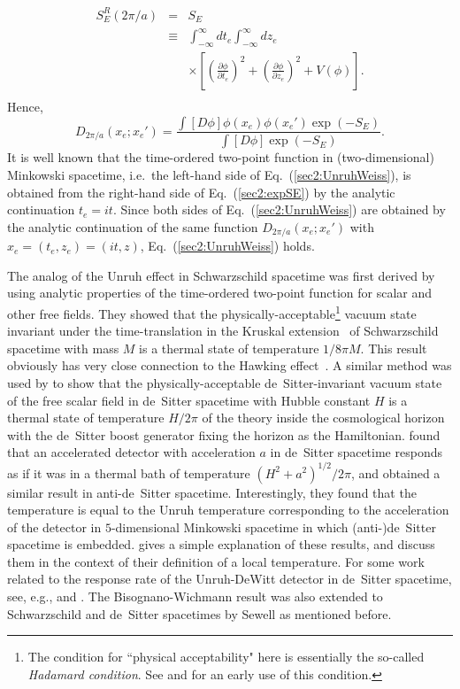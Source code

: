 \documentclass[12pt,nofootinbib,floatfix,aps,prd,showpacs,amsmath,amssymb,eqsecnum]{revtex4-2}
\let\cite\citep
\begin{document}
\begin{eqnarray}
S_E^R(2\pi/a) & = & S_E\nonumber \\
& \equiv & \int_{-\infty}^\infty dt_e \int_{-\infty}^\infty
dz_e\nonumber \\
&& \times \left[ \left(\frac{\partial\phi}{\partial t_e}\right)^2
+ \left(\frac{\partial\phi}{\partial z_e}\right)^2 + V(\phi)\right].
\nonumber \\
\end{eqnarray}
Hence,
\begin{equation}
D_{2\pi/a}(x_e;x_e')
= \frac{\int \left[D\phi\right]\phi(x_e)\phi(x_e')\exp(-S_E)}{
\int\left[D\phi\right] \exp(-S_E)}. \label{sec2:expSE}
\end{equation}
It is well known that the time-ordered two-point function in
(two-dimensional) Minkowski spacetime, i.e.~the left-hand side of
Eq.~(\ref{sec2:UnruhWeiss}), is obtained from the right-hand
side of Eq.~(\ref{sec2:expSE}) 
by the analytic continuation $t_e = it$.  Since both sides of
Eq.~(\ref{sec2:UnruhWeiss}) are obtained by the analytic continuation of
the same function $D_{2\pi/a}(x_e;x_e')$ 
with $x_e = (t_e,z_e) = (it,z)$, Eq.~(\ref{sec2:UnruhWeiss}) holds.

The analog of the Unruh effect in Schwarzschild spacetime
was first derived by
\textcite{Hartleetal76} using analytic properties of the time-ordered 
two-point function for scalar and other free fields.
They showed that the
physically-acceptable\footnote{The condition for ``physical
acceptability" here is essentially 
the so-called {\em Hadamard condition}.  See
\textcite{Wald78} and \textcite{Fullingetal78} 
for an early use of this condition.}
vacuum state invariant under the time-translation in the Kruskal
extension~\cite{Kruskal60} of Schwarzschild spacetime with mass $M$ is
a thermal state of temperature $1/8\pi M$.  
This result obviously has very close connection
to the Hawking effect~\cite{Hawking74}. 
A similar method was used by \textcite{Gibbonsetal77} to show that the
physically-acceptable de~Sitter-invariant vacuum state
of the free scalar field in de~Sitter
spacetime with Hubble constant $H$ is a thermal state of temperature
$H/2\pi$ of the theory inside the cosmological horizon with the
de~Sitter boost generator fixing the horizon as the Hamiltonian.  
\textcite{Narnhoferetal96} found that an accelerated detector with
acceleration $a$ in de~Sitter spacetime responds as if it was in a
thermal bath of temperature $(H^2 + a^2)^{1/2}/2\pi$, and
\textcite{Deseretal97} obtained a similar result in anti-de~Sitter
spacetime.  Interestingly, they found that the temperature is equal to 
the Unruh
temperature corresponding to the 
acceleration of the detector in $5$-dimensional
Minkowski spacetime in which (anti-)de~Sitter spacetime is embedded.
\textcite{Jacobson98} gives a simple explanation of these results, and
\textcite{Buchholzetal07} discuss them in the context of their definition
of a local temperature.  For
some work related to the response rate of the Unruh-DeWitt detector in
de~Sitter spacetime, see, e.g., \textcite{Higuchi87} and
\textcite{Garbrechtetal04a,Garbrechtetal04b}.
The Bisognano-Wichmann result was also extended to Schwarzschild and
de~Sitter spacetimes by Sewell as mentioned before.
\end{document}
